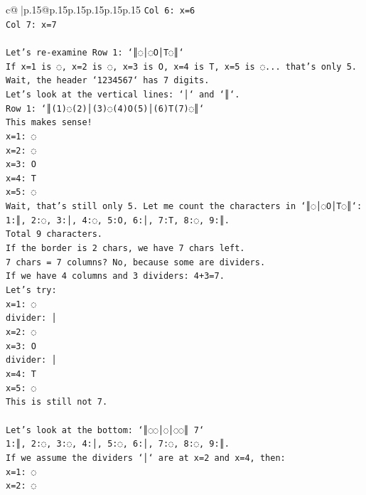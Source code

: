 \documentclass{article}
\begin{document}
{\begin{supertabular}{c@{$\;$}|p{.15\linewidth}@{}p{.15\linewidth}p{.15\linewidth}p{.15\linewidth}p{.15\linewidth}p{.15\linewidth}}
{{{\texttt{Col 6: x=6} \\
\texttt{Col 7: x=7} \\
\\ 
\texttt{Let's re{-}examine Row 1: `║◌│◌O│T◌║`} \\
\texttt{If x=1 is ◌, x=2 is ◌, x=3 is O, x=4 is T, x=5 is ◌... that's only 5.} \\
\texttt{Wait, the header `1234567` has 7 digits.} \\
\texttt{Let's look at the vertical lines: `│` and `║`.} \\
\texttt{Row 1: `║(1)◌(2)│(3)◌(4)O(5)│(6)T(7)◌║`} \\
\texttt{This makes sense!} \\
\texttt{x=1: ◌} \\
\texttt{x=2: ◌} \\
\texttt{x=3: O} \\
\texttt{x=4: T} \\
\texttt{x=5: ◌} \\
\texttt{Wait, that's still only 5. Let me count the characters in `║◌│◌O│T◌║`:} \\
\texttt{1:║, 2:◌, 3:│, 4:◌, 5:O, 6:│, 7:T, 8:◌, 9:║.} \\
\texttt{Total 9 characters.} \\
\texttt{If the border is 2 chars, we have 7 chars left.} \\
\texttt{7 chars = 7 columns? No, because some are dividers.} \\
\texttt{If we have 4 columns and 3 dividers: 4+3=7.} \\
\texttt{Let's try:} \\
\texttt{x=1: ◌} \\
\texttt{divider: │} \\
\texttt{x=2: ◌} \\
\texttt{x=3: O} \\
\texttt{divider: │} \\
\texttt{x=4: T} \\
\texttt{x=5: ◌} \\
\texttt{This is still not 7.} \\
\\ 
\texttt{Let's look at the bottom: `║◌◌│◌│◌◌║ 7`} \\
\texttt{1:║, 2:◌, 3:◌, 4:│, 5:◌, 6:│, 7:◌, 8:◌, 9:║.} \\
\texttt{If we assume the dividers `│` are at x=2 and x=4, then:} \\
\texttt{x=1: ◌} \\
\texttt{x=2: ◌} \\
}}}
\end{supertabular}}
\end{document}
